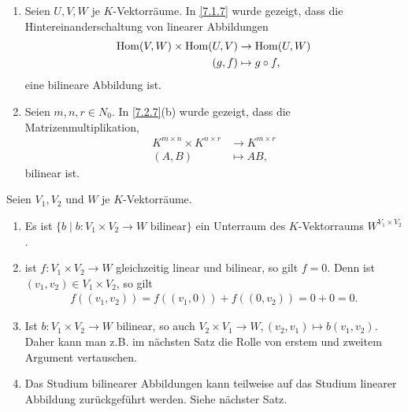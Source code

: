\documentclass[../../main.tex]{subfiles}
\begin{document}
\begin{bsp}\label{13.2.3}
	$\;$
	\begin{enumerate}[\normalfont(a)]
		\item Seien $U,V,W$ je $K$-Vektorräume. In \ref{7.1.7} wurde gezeigt, dass die Hintereinanderschaltung von linearer Abbildungen
		\begin{align*}
			\operatorname{Hom}(V,W)\times \operatorname{Hom}(U,V)&\to\operatorname{Hom}(U,W)\\
			(g,f)&\mapsto g\circ f,
		\end{align*}		
		eine bilineare Abbildung ist.		
		\item Seien $m,n,r\in N_0$. In \ref{7.2.7}(b) wurde gezeigt, dass die Matrizenmultiplikation,
		\begin{align*}
			K^{m\times n}\times K^{n\times r}&\to K^{m\times r}\\
			(A,B)&\mapsto AB,
		\end{align*}
		bilinear ist.
	\end{enumerate}
\end{bsp}

\begin{bem} \label{13.2.4}
	Seien $V_1,V_2$ und $W$ je $K$-Vektorräume.
	\begin{enumerate}[\normalfont(a)]
		\item Es ist $\{b\mid b: V_1\times V_2\to W\text{ bilinear}\}$ ein Unterraum des $K$-Vektorraums $W^{V_1\times V_2}$.
		\item ist $f: V_1\times V_2\to W$ gleichzeitig linear und bilinear, so gilt $f=0$. Denn ist $(v_1,v_2)\in V_1\times V_2$, so gilt
		\begin{align*}
			f((v_1,v_2))=f((v_1,0))+f((0,v_2))=0+0=0.
		\end{align*}
		\item Ist $b: V_1\times V_2\to W$ bilinear, so auch $V_2\times V_1\to W, (v_2,v_1)\mapsto b(v_1,v_2)$. Daher kann man z.B. im nächsten Satz die Rolle von erstem und zweitem Argument vertauschen.
		\item Das Studium bilinearer Abbildungen kann teilweise auf das Studium linearer Abbildung zurückgeführt werden. Siehe nächster Satz.
	\end{enumerate}
\end{bem}
\end{document}
